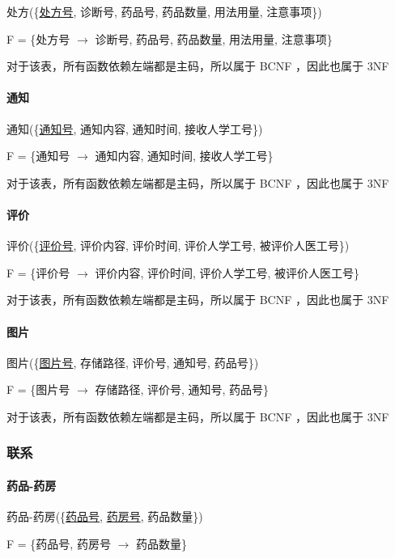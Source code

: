 \documentclass{article}
\begin{document}
处方(\{\underline{处方号}, 诊断号, 药品号, 药品数量, 用法用量, 注意事项\})

F = \{处方号 $\rightarrow$ 诊断号, 药品号, 药品数量, 用法用量, 注意事项\}

对于该表，所有函数依赖左端都是主码，所以属于 BCNF ，因此也属于 3NF

\paragraph{通知}

通知(\{\underline{通知号}, 通知内容, 通知时间, 接收人学工号\})

F = \{通知号 $\rightarrow$ 通知内容, 通知时间, 接收人学工号\}

对于该表，所有函数依赖左端都是主码，所以属于 BCNF ，因此也属于 3NF

\paragraph{评价}

评价(\{\underline{评价号}, 评价内容, 评价时间, 评价人学工号, 被评价人医工号\})

F = \{评价号 $\rightarrow$ 评价内容, 评价时间, 评价人学工号, 被评价人医工号\}

对于该表，所有函数依赖左端都是主码，所以属于 BCNF ，因此也属于 3NF

\paragraph{图片}

图片(\{\underline{图片号}, 存储路径, 评价号, 通知号, 药品号\})

F = \{图片号 $\rightarrow$ 存储路径, 评价号, 通知号, 药品号\}

对于该表，所有函数依赖左端都是主码，所以属于 BCNF ，因此也属于 3NF

\subsubsection{联系}

\paragraph{药品-药房}

药品-药房(\{\underline{药品号}, \underline{药房号}, 药品数量\})

F = \{药品号, 药房号 $\rightarrow$ 药品数量\}
\end{document}
